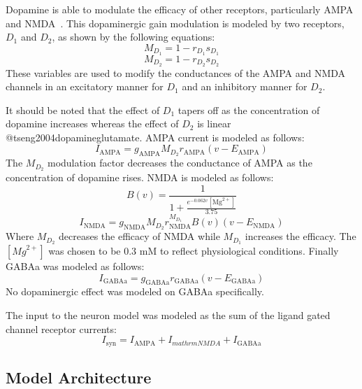 \documentclass[twocolumn]{article}
\begin{document}
Dopamine is able to modulate the efficacy of other receptors, particularly AMPA and NMDA~\cite{hernandez2004modulation,higley2010competitive,tseng2004dopamineglutamate}.
This dopaminergic gain modulation is modeled by two receptors, $D_1$ and $D_2$, as shown by the following equations:
\begin{equation*}
    M_{D_1} = 1 - r_{D_1} s_{D_1}
\end{equation*}
\begin{equation*}
    M_{D_2} = 1 - r_{D_2} s_{D_2}
\end{equation*}
These variables are used to modify the conductances of the AMPA and NMDA channels in an excitatory manner for $D_1$ and an inhibitory manner for $D_2$. 

It should be noted that the effect of $D_1$ tapers off as the concentration of dopamine increases whereas the effect of $D_2$ is linear @tseng2004dopamineglutamate. 
AMPA current is modeled as follows:
\begin{equation*}
    I_{\mathrm{AMPA}} = g_{\mathrm{AMPA}} M_{D_2} r_{\mathrm{AMPA}} (v - E_{\mathrm{AMPA}})
\end{equation*}
The $M_{D_2}$ modulation factor decreases the conductance of AMPA as the concentration of dopamine rises. NMDA is modeled as follows:
\begin{equation*}
    B(v) = \frac{1}{1 + \frac{e ^ {-0.062 v} [{\mathrm{Mg}}^{2+}]}{3.75}}
\end{equation*}
\begin{equation*}
    I_{\mathrm{NMDA}} = g_{\mathrm{NMDA}} M_{D_2} r_{\mathrm{NMDA}} ^ {M_{D_1}} B(v) (v - E_{\mathrm{NMDA}})
\end{equation*}
Where $M_{D_2}$ decreases the efficacy of NMDA while $M_{D_1}$ increases the efficacy. The $[{Mg}^{2+}]$ was chosen to be 0.3 mM to reflect physiological conditions. Finally GABAa was modeled as follows:
\begin{equation*}
    I_{\mathrm{GABAa}} = g_{\mathrm{GABAa}} r_{\mathrm{GABAa}} (v - E_{\mathrm{GABAa}})
\end{equation*}
No dopaminergic effect was modeled on GABAa specifically. 

The input to the neuron model was modeled as the sum of the ligand gated channel receptor currents:
\begin{equation*}
    I_{\mathrm{syn}} = I_{\mathrm{AMPA}} + I_{mathrm{NMDA}} + I_{\mathrm{GABAa}}
\end{equation*}

\subsection{Model Architecture}
\end{document}

